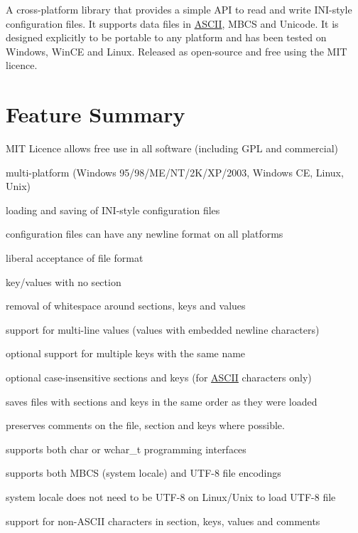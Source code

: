 A cross-\/platform library that provides a simple A\+PI to read and write I\+N\+I-\/style configuration files. It supports data files in \hyperlink{a02172}{A\+S\+C\+II}, M\+B\+CS and Unicode. It is designed explicitly to be portable to any platform and has been tested on Windows, Win\+CE and Linux. Released as open-\/source and free using the M\+IT licence.

\section*{Feature Summary}


\begin{DoxyItemize}
\item M\+IT Licence allows free use in all software (including G\+PL and commercial)
\item multi-\/platform (Windows 95/98/\+M\+E/\+N\+T/2\+K/\+X\+P/2003, Windows CE, Linux, Unix)
\item loading and saving of I\+N\+I-\/style configuration files
\item configuration files can have any newline format on all platforms
\item liberal acceptance of file format
\begin{DoxyItemize}
\item key/values with no section
\item removal of whitespace around sections, keys and values
\end{DoxyItemize}
\item support for multi-\/line values (values with embedded newline characters)
\item optional support for multiple keys with the same name
\item optional case-\/insensitive sections and keys (for \hyperlink{a02172}{A\+S\+C\+II} characters only)
\item saves files with sections and keys in the same order as they were loaded
\item preserves comments on the file, section and keys where possible.
\item supports both char or wchar\+\_\+t programming interfaces
\item supports both M\+B\+CS (system locale) and U\+T\+F-\/8 file encodings
\item system locale does not need to be U\+T\+F-\/8 on Linux/\+Unix to load U\+T\+F-\/8 file
\item support for non-\/\+A\+S\+C\+II characters in section, keys, values and comments

\end{DoxyItemize}
